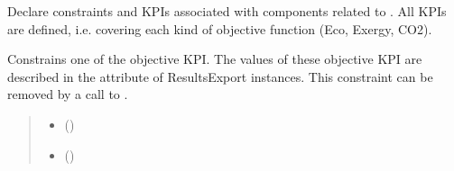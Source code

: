 \documentclass[letterpaper,10pt,english]{sphinxmanual}
\begin{document}
\begin{fulllineitems}

\begin{fulllineitems}
\label{\detokenize{generated/tamos.MILPModel:tamos.MILPModel.declare_constraints_and_KPIs}}
\pysigstartsignatures
{}
\pysigstopsignatures
\sphinxAtStartPar
Declare constraints and KPIs associated with components related to .
All KPIs are defined, i.e. covering each kind of objective function (Eco, Exergy, CO2).

\end{fulllineitems}


\begin{fulllineitems}
\label{\detokenize{generated/tamos.MILPModel:tamos.MILPModel.declare_max_KPI_constraint}}
\pysigstartsignatures
{}
\pysigstopsignatures
\sphinxAtStartPar
Constrains one of the objective KPI.
The values of these objective KPI are described in the  attribute of ResultsExport instances.
This constraint can be removed by a call to .
\begin{quote}\begin{description}
\begin{itemize}
\item {} 
\sphinxAtStartPar
{} (\sphinxstyleliteralemphasis{\sphinxupquote{, }}\sphinxstyleliteralemphasis{\sphinxupquote{, }}) \textendash{} 

\item {} 
\sphinxAtStartPar
{} () \textendash{} 

\end{itemize}


\end{description}
\end{quote}
\end{fulllineitems}
\end{fulllineitems}
\end{document}
